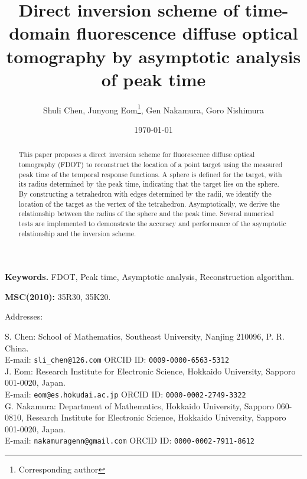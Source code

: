 \documentclass[10pt]{article}
\numberwithin{equation}{section}
\numberwithin{figure}{section}
\begin{document}
\setlength\arraycolsep{2pt}
\date{\today}
       
\title{Direct inversion scheme of time-domain fluorescence diffuse optical tomography
by asymptotic analysis of peak time}
\author{Shuli Chen,\; Junyong Eom\thanks{Corresponding author},\; Gen Nakamura,\; Goro  Nishimura}


\maketitle
\begin{abstract}
This paper proposes a direct inversion scheme for fluorescence diffuse optical tomography (FDOT) to reconstruct the location of a point target using the measured peak time of the temporal response functions. A sphere is defined for the target, with its radius determined by the peak time, indicating that the target lies on the sphere. By constructing a tetrahedron with edges determined by the radii, we identify the location of the target as the vertex of the tetrahedron.
Asymptotically, we derive the relationship between the radius of the sphere and the peak time. Several numerical tests are implemented to demonstrate the accuracy and performance of the asymptotic relationship and the inversion scheme.
\end{abstract}

\medskip
{\bf Keywords.} FDOT, Peak time, Asymptotic analysis, Reconstruction algorithm.

\medskip
{\bf MSC(2010):} 35R30, 35K20.

\vspace{10pt}
\noindent Addresses:

\noindent S. Chen:
School of Mathematics, Southeast University, Nanjing 210096, P. R. China. \\
\noindent 
E-mail: {\tt sli\_chen@126.com} \;
ORCID ID: {\tt 0009-0000-6563-5312}\\

\noindent J. Eom:  
Research Institute for Electronic Science, Hokkaido University, Sapporo 001-0020, Japan.\\
\noindent 
E-mail: {\tt eom@es.hokudai.ac.jp} \;
ORCID ID: {\tt 0000-0002-2749-3322}\\

\noindent G. Nakamura:  Department of Mathematics, Hokkaido University, Sapporo 060-0810,
Research Institute for Electronic Science, Hokkaido University, Sapporo 001-0020, Japan.\\
\noindent 
E-mail: {\tt nakamuragenn@gmail.com} \; 
ORCID ID: {\tt 0000-0002-7911-8612}\\
\end{document}
